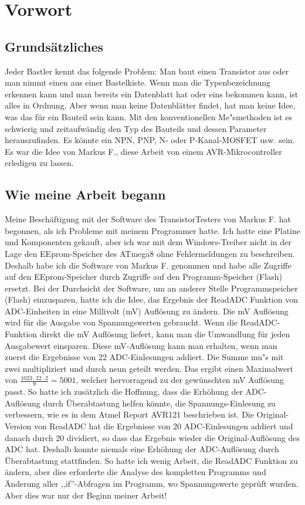 \section*{Vorwort}

\subsection*{Grunds\"atzliches}
Jeder Bastler kennt das folgende Problem: Man baut einen Transistor aus oder man nimmt einen aus einer Bastelkiste.
Wenn man die Typenbezeichnung erkennen kann und man bereits ein Datenblatt hat oder eins bekommen kann, ist alles in Ordnung.
Aber wenn man keine Datenbl\"atter findet, hat man keine Idee, was das f\"ur ein Bauteil sein kann.
Mit den konventionellen Me"smethoden ist es schwierig und zeitaufw\"andig den Typ des Bauteils und dessen Parameter herauszufinden.
Es k\"onnte ein NPN, PNP, N- oder P-Kanal-MOSFET usw. sein. 
Es war die Idee von Markus F., diese Arbeit von einem AVR-Mikrocontroller erledigen zu lassen.

\subsection*{Wie meine Arbeit begann}
Meine Besch\"aftigung mit der Software des TransistorTesters von Markus F. \cite{Frejek} hat begonnen, als ich Probleme mit
meinem Programmer hatte.
Ich hatte eine Platine und Komponenten gekauft, aber ich war mit dem Windows-Treiber nicht in der Lage den EEprom-Speicher des ATmega8
ohne Fehlermeldungen zu beschreiben.
Deshalb habe ich die Software von Markus F. genommen und habe alle Zugriffe auf den EEprom-Speicher durch
Zugriffe auf den Programm-Speicher (Flash) ersetzt.
Bei der Durchsicht der Software, um an anderer Stelle Programmspeicher (Flash) einzusparen, hatte ich die Idee,
das Ergebnis der ReadADC Funktion von ADC-Einheiten in eine Millivolt (mV) Aufl\"osung zu \"andern.
Die mV Aufl\"osung wird f\"ur die Ausgabe von Spannungswerten gebraucht.
Wenn die ReadADC-Funktion direkt die mV Aufl\"osung liefert, kann man die Umwandlung f\"ur jeden
Ausgabewert einsparen.
Diese mV-Aufl\"osung kann man erhalten, wenn man zuerst die Ergebnisse von 22 ADC-Einlesungen addiert.
Die Summe mu"s mit zwei multipliziert und durch neun geteilt werden.
Das ergibt einen Maximalwert von \begin{math}\frac{1023\cdot22\cdot2}{9} = 5001\end{math},
welcher hervorragend zu der gew\"unschten mV Aufl\"osung passt.
So hatte ich zus\"atzlich die Hoffnung, dass die Erh\"ohung der ADC-Aufl\"osung durch \"Uberabtastung helfen
k\"onnte, die Spannungs-Einlesung zu verbessern, wie es in dem Atmel Report AVR121 \cite{AVR121} beschrieben ist.
Die Original-Version von ReadADC hat die Ergebnisse von 20 ADC-Einlesungen addiert und danach durch 20 dividiert,
so dass das Ergebnis wieder die Original-Aufl\"osung des ADC hat. Deshalb konnte niemals eine Erh\"ohung der ADC-Aufl\"osung
durch \"Uberabtastung stattfinden.
So hatte ich wenig Arbeit, die ReadADC Funktion zu \"andern, aber dies erforderte die Analyse des kompletten
Programms und \"Anderung aller ,,if''-Abfragen im Programm, wo Spannungswerte gepr\"uft wurden.
Aber dies war nur der Beginn meiner Arbeit!

